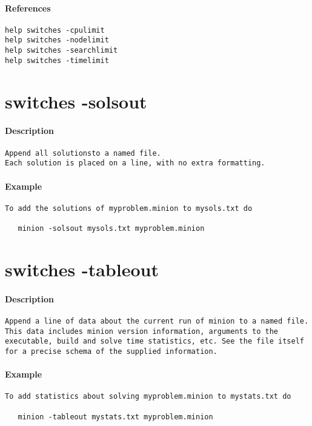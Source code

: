 \paragraph{References}
{\footnotesize
\begin{verbatim}
help switches -cpulimit
help switches -nodelimit
help switches -searchlimit
help switches -timelimit
\end{verbatim}
}
\section{switches -solsout}
\paragraph{Description}
{\footnotesize
\begin{verbatim}
Append all solutionsto a named file.
Each solution is placed on a line, with no extra formatting.
\end{verbatim}
}
\paragraph{Example}
{\footnotesize
\begin{verbatim}
To add the solutions of myproblem.minion to mysols.txt do

   minion -solsout mysols.txt myproblem.minion
\end{verbatim}
}
\section{switches -tableout}
\paragraph{Description}
{\footnotesize
\begin{verbatim}
Append a line of data about the current run of minion to a named file.
This data includes minion version information, arguments to the
executable, build and solve time statistics, etc. See the file itself
for a precise schema of the supplied information.
\end{verbatim}
}
\paragraph{Example}
{\footnotesize
\begin{verbatim}
To add statistics about solving myproblem.minion to mystats.txt do

   minion -tableout mystats.txt myproblem.minion
\end{verbatim}
}
